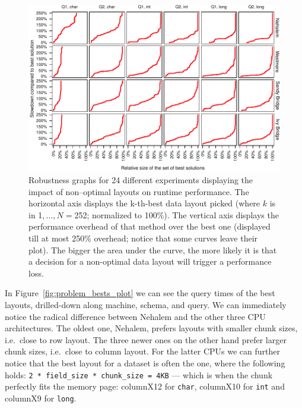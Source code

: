 \documentclass{sig-alternate}
\begin{document}
\begin{figure}[!ht]
\centering
\includegraphics[width=.97\textwidth]{pdf/fragility.pdf}
\vspace{-10pt}
\caption{Robustness graphs for 24 different experiments displaying the impact of non--optimal layouts on runtime performance. The horizontal axis displays the k-th-best data layout picked (where $k$ is in 1$,\ldots, N=$252; normalized to 100\%). The vertical axis displays the performance overhead of that method over the best one (displayed till at most 250\% overhead; notice that some curves leave their plot).
The bigger the area under the curve, the more likely it is that a decision for a non-optimal data layout will trigger a performance loss. }  
\label{fig:fragility}
\vspace{-10pt}
\end{figure}

In Figure~\ref{fig:problem_bests_plot} we can see the query times of the best layouts, drilled-down along machine, schema, and query. We can immediately notice the radical difference between Nehalem and the other three CPU architectures. The oldest one, Nehalem, prefers layouts with smaller chunk sizes, i.e.~close to row layout. The three newer ones on the other hand prefer larger chunk sizes, i.e.~close to column layout. For the latter CPUs we can further notice that the best layout for a dataset is often the one, where the following holds: \texttt{2~* field\_size * chunk\_size = 4KB} --- which is when the chunk perfectly fits the memory page: columnX12 for \texttt{char}, columnX10 for \texttt{int} and columnX9 for \texttt{long}.
\end{document}

